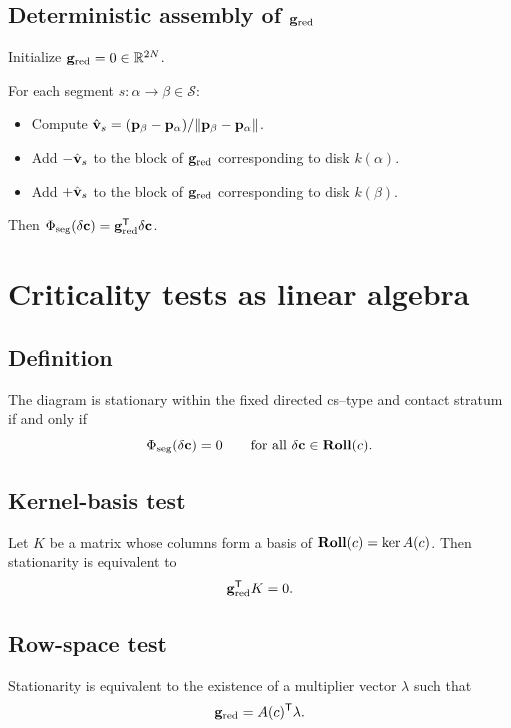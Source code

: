 \documentclass[12pt,letterpaper]{amsart}
\theoremstyle{definition}
\theoremstyle{remark}
\newcommand{\Roll}{\text{\rm \bf Roll}}
\newcommand{\R}{{\mathbb{R}}}
\begin{document}
\subsection{Deterministic assembly of ${\bf g}_{\rm red}$}

Initialize ${\bf g}_{\rm red}=0\in\R^{2N}$.

For each segment $s:\alpha\to\beta\in\mathcal S$:
\begin{itemize}
\item Compute $\hat{\bf v}_s=({\bf p}_\beta-{\bf p}_\alpha)/\|{\bf p}_\beta-{\bf p}_\alpha\|$.
\item Add $-\hat{\bf v}_s$ to the block of ${\bf g}_{\rm red}$ corresponding to disk $k(\alpha)$.
\item Add $+\hat{\bf v}_s$ to the block of ${\bf g}_{\rm red}$ corresponding to disk $k(\beta)$.
\end{itemize}

Then $\Phi_{\rm seg}(\delta{\bf c})={\bf g}_{\rm red}^\mathsf T\delta{\bf c}$.

\section{Criticality tests as linear algebra}

\subsection{Definition}

The diagram is stationary within the fixed directed cs--type and contact stratum if and only if
\[
\Phi_{\rm seg}(\delta{\bf c})=0
\qquad
\text{for all }\delta{\bf c}\in\Roll(c).
\]

\subsection{Kernel-basis test}

Let $K$ be a matrix whose columns form a basis of $\Roll(c)=\ker A(c)$.
Then stationarity is equivalent to
\[
{\bf g}_{\rm red}^\mathsf T K=0.
\]

\subsection{Row-space test}

Stationarity is equivalent to the existence of a multiplier vector $\lambda$ such that
\[
{\bf g}_{\rm red}=A(c)^\mathsf T\lambda.
\]
\end{document}
